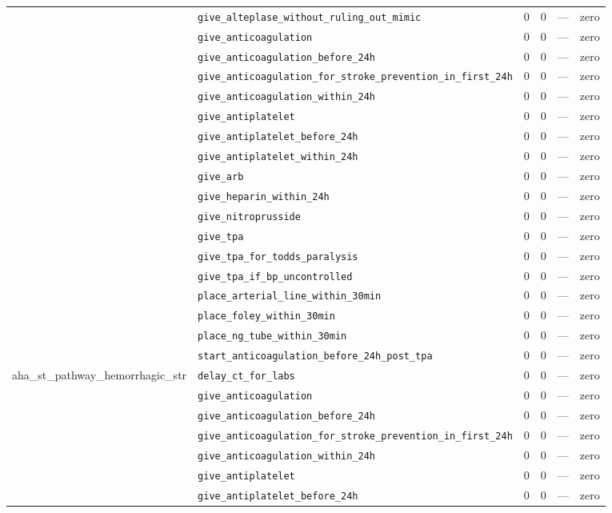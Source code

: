 \begin{table}[ht]
\begin{tabular}{llrrrl}
 & \texttt{give\_alteplase\_without\_ruling\_out\_mimic} & 0 & 0 & — & zero \\
 & \texttt{give\_anticoagulation} & 0 & 0 & — & zero \\
 & \texttt{give\_anticoagulation\_before\_24h} & 0 & 0 & — & zero \\
 & \texttt{give\_anticoagulation\_for\_stroke\_prevention\_in\_first\_24h} & 0 & 0 & — & zero \\
 & \texttt{give\_anticoagulation\_within\_24h} & 0 & 0 & — & zero \\
 & \texttt{give\_antiplatelet} & 0 & 0 & — & zero \\
 & \texttt{give\_antiplatelet\_before\_24h} & 0 & 0 & — & zero \\
 & \texttt{give\_antiplatelet\_within\_24h} & 0 & 0 & — & zero \\
 & \texttt{give\_arb} & 0 & 0 & — & zero \\
 & \texttt{give\_heparin\_within\_24h} & 0 & 0 & — & zero \\
 & \texttt{give\_nitroprusside} & 0 & 0 & — & zero \\
 & \texttt{give\_tpa} & 0 & 0 & — & zero \\
 & \texttt{give\_tpa\_for\_todds\_paralysis} & 0 & 0 & — & zero \\
 & \texttt{give\_tpa\_if\_bp\_uncontrolled} & 0 & 0 & — & zero \\
 & \texttt{place\_arterial\_line\_within\_30min} & 0 & 0 & — & zero \\
 & \texttt{place\_foley\_within\_30min} & 0 & 0 & — & zero \\
 & \texttt{place\_ng\_tube\_within\_30min} & 0 & 0 & — & zero \\
 & \texttt{start\_anticoagulation\_before\_24h\_post\_tpa} & 0 & 0 & — & zero \\
\midrule
aha\_st\_pathway\_hemorrhagic\_str & \texttt{delay\_ct\_for\_labs} & 0 & 0 & — & zero \\
 & \texttt{give\_anticoagulation} & 0 & 0 & — & zero \\
 & \texttt{give\_anticoagulation\_before\_24h} & 0 & 0 & — & zero \\
 & \texttt{give\_anticoagulation\_for\_stroke\_prevention\_in\_first\_24h} & 0 & 0 & — & zero \\
 & \texttt{give\_anticoagulation\_within\_24h} & 0 & 0 & — & zero \\
 & \texttt{give\_antiplatelet} & 0 & 0 & — & zero \\
 & \texttt{give\_antiplatelet\_before\_24h} & 0 & 0 & — & zero \\

\end{tabular}
\end{table}
